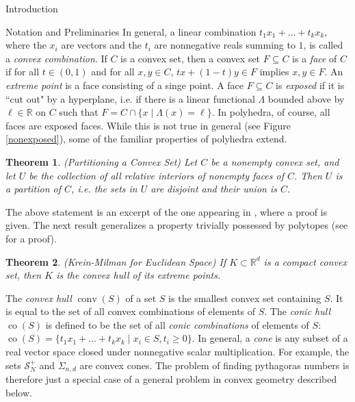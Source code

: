 \documentclass[12pt,oneside,final]{ucthesisucsbmath2010}
\newcommand{\R}{\mathbb{R}}
\newcommand{\s}{\mathcal{S}}
\newcommand{\snd}{\Sigma_{n,d}}
\DeclareMathOperator{\conv}{conv}
\DeclareMathOperator{\co}{co}
\newtheorem{thm}{Theorem}[section]
\theoremstyle{definition}
\begin{document}
\begin{chapter}{Introduction}
\begin{section}{Notation and Preliminaries}
In general, a linear combination $t_1x_1+\ldots+t_kx_k$, where the $x_i$ are vectors and the $t_i$ are nonnegative reals summing to $1$, is called a \emph{convex combination}. If $C$ is a convex set, then a convex set $F\subseteq C$ is a \emph{face} of $C$ if for all $t \in (0,1)$ and for all $x,y \in C$, $tx+(1-t)y \in F$ implies $x,y \in F$. An \emph{extreme point} is a face consisting of a singe point. A face $F\subseteq C$ is \emph{exposed} if it is ``cut out" by a hyperplane, i.e. if there is a linear functional $\Lambda$ bounded above by $\ell \in \R$ on $C$ such that $F=C\cap \{x \mid \Lambda(x) = \ell\}$. In polyhedra, of course, all faces are exposed faces. While this is not true in general (see Figure \ref{nonexposed}), some of the familiar properties of polyhedra extend.
\begin{thm}(Partitioning a Convex Set) Let $C$ be a nonempty convex set, and let $U$ be the collection of all relative interiors of nonempty faces of $C$. Then $U$ is a partition of $C$, i.e. the sets in $U$ are disjoint and their union is $C$.
\label{Partitioning}
\end{thm}
The above statement is an excerpt of the one appearing in \cite{Rockafellar}, where a proof is given. The next result generalizes a property trivially possessed by polytopes (see \cite{Barvinok} for a proof).
\begin{thm}(Krein-Milman for Euclidean Space) If $K \subset \R^d$ is a compact convex set, then $K$ is the convex hull of its extreme points.
\label{Krein}
\end{thm}

The \emph{convex hull} $\conv(S)$ of a set $S$ is the smallest convex set containing $S$. It is equal to the set of all convex combinations of elements of $S$. The \emph{conic hull} $\co(S)$ is defined to be the set of all \emph{conic combinations} of elements of $S$: $\co(S) = \{ t_1x_1+\ldots+t_kx_k \mid x_i \in S, t_i \geq 0\}$. In general, a \emph{cone} is any subset of a real vector space closed under nonnegative scalar multiplication. For example, the sets $\s_N^+$ and $\snd$ are convex cones. The problem of finding pythagoras numbers is therefore just a special case of a general problem in convex geometry described below.

\begin{figure}[H]
  

\end{figure}
\end{section}
\end{chapter}
\end{document}
